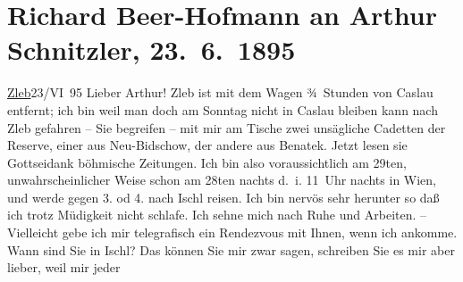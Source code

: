 

               \section[Richard Beer-Hofmann an Arthur Schnitzler, 23. 6. 1895]{ Richard Beer-Hofmann an Arthur Schnitzler, 23. 6. 1895}\nopagebreak{}\rehead{ }\begin{ledgroupsized}[t]{13cm}\normalsize\beginnumbering{} \toendnotes[C]{\smallbreak\pagebreak[2]} 
\pstart
           {\pb}\uline{Zleb}23/VI 95\pend
           \pstart
           Lieber Arthur! Zleb ist mit
                    dem Wagen ¾ Stunden von Caslau entfernt; ich
                    bin weil man doch am Sonntag nicht in Caslau bleiben kann nach Zleb gefahren – Sie begreifen – mit mir am Tische zwei
                    unsägliche Cadetten der Reserve, einer aus Neu-Bidschow, der andere {\pb}aus Benatek. Jetzt lesen sie Gottseidank böhmische Zeitungen.\pend
           \pstart
           Ich bin also voraussichtlich am 29ten, unwahrscheinlicher Weise
                    schon am 28ten{ }nachts d. i. 11 Uhr nachts in Wien, und werde gegen 3. od 4. nach
                        Ischl reisen. Ich bin nervös sehr
                    herunter {\pb}so daß ich trotz
                    Müdigkeit nicht schlafe. Ich sehne mich nach Ruhe und Arbeiten. –\pend
           \pstart
           Vielleicht gebe ich mir telegrafisch ein Rendezvous mit Ihnen, wenn ich ankomme.
                    Wann sind Sie in Ischl? Das können Sie mir
                    zwar sagen, schreiben Sie es mir {\pb}aber lieber, weil mir jeder

\end{ledgroupsized}
